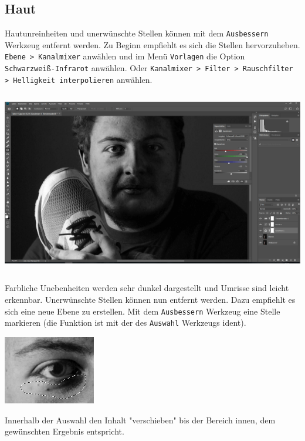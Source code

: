 \documentclass[notoc, landscape]{school}
\begin{document}
\subsection{Haut}
\begin{outline}[enumerate]
\1 Hautunreinheiten und unerwünschte Stellen können mit dem \texttt{Ausbessern} Werkzeug entfernt werden.
	\2 Zu Beginn empfiehlt es sich die Stellen hervorzuheben.
		\3 \texttt{Ebene > Kanalmixer} anwählen und im Menü \texttt{Vorlagen} die Option\\\texttt{Schwarzweiß-Infrarot} anwählen.
			\4 Oder \texttt{Kanalmixer > Filter > Rauschfilter > Helligkeit interpolieren} anwählen.

\includegraphics[height=8cm]{retusche-04-kanalmixer.png}

		\3 Farbliche Unebenheiten werden sehr dunkel dargestellt und Umrisse sind leicht erkennbar.
	\newpage
	\2 Unerwünschte Stellen können nun entfernt werden. Dazu empfiehlt es sich eine neue Ebene zu erstellen.
		\3 Mit dem \texttt{Ausbessern} Werkzeug eine Stelle markieren (die Funktion ist mit der des \texttt{Auswahl} Werkzeugs ident).

\includegraphics[height=3cm]{retusche-05-auswahl.png}

		\3 Innerhalb der Auswahl den Inhalt "verschieben" bis der Bereich innen, dem gewünschten Ergebnis entspricht.


\end{outline}
\end{document}
